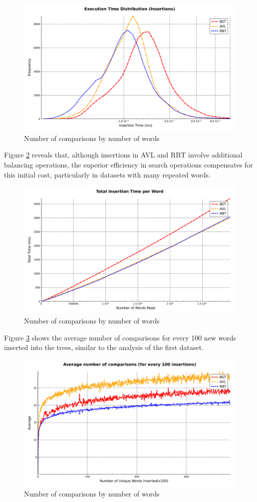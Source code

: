  \begin{figure}[H]
     \centering
     \includegraphics[width=0.8\linewidth]{img/Graph_5_77770.pdf}
     \caption{Number of comparisons by number of words}
     \label{fig:timedist}
 \end{figure}

 Figure \ref{fig:cumulativedist} reveals that, although insertions in AVL and RBT
 involve additional balancing operations, the superior efficiency in search operations
 compensates for this initial cost, particularly in datasets with many repeated words.

 \begin{figure}[H]
     \centering
     \includegraphics[width=0.8\linewidth]{img/Graph_4_77770.pdf}
     \caption{Number of comparisons by number of words}
     \label{fig:cumulativedist}
 \end{figure}
Figure \ref{fig:mean-log2} shows the average number of comparisons for every 100 new words 
inserted into the trees, similar to the analysis of the first dataset.
\begin{figure}[H]
     \centering
     \includegraphics[width=0.8\linewidth]{img/Graph_3_77770.pdf}
     \caption{Number of comparisons by number of words}
     \label{fig:mean-log2}
\end{figure}

